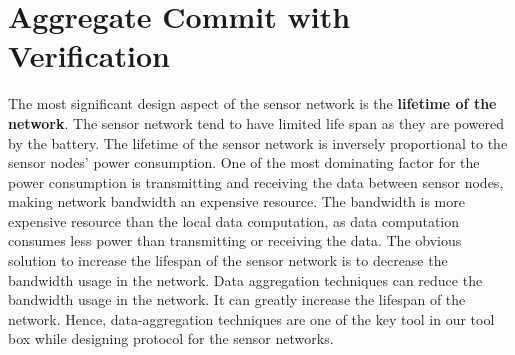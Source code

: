 \chapter{Aggregate Commit with Verification} %
\label{cha:A Protocol for Commitment Tree Generation}
	The most significant design aspect of the sensor network is the \textbf{lifetime of the network}.
	The sensor network tend to have limited life span as they are powered by the battery.
	The lifetime of the sensor network is inversely proportional to the sensor nodes' power consumption.
	One of the most dominating factor for the power consumption is transmitting and receiving the data between sensor nodes, making network bandwidth an expensive resource.
	The bandwidth is more expensive resource than the local data computation, as data computation consumes less power than transmitting or receiving the data.
	The obvious solution to increase the lifespan of the sensor network is to decrease the bandwidth usage in the network.  	
	Data aggregation techniques can reduce the bandwidth usage in the network. 
	It can greatly increase the lifespan of the network.
	Hence, data-aggregation techniques are one of the key tool in our tool box while designing protocol for the sensor networks.


